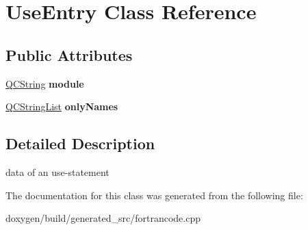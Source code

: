\hypertarget{class_use_entry}{}\section{Use\+Entry Class Reference}
\label{class_use_entry}
\subsection*{Public Attributes}
\begin{DoxyCompactItemize}
\item 
\mbox{\label{class_use_entry_a84f8f457213f3f11338ad766412dbb4b}} 
\mbox{\hyperlink{class_q_c_string}{Q\+C\+String}} {\bfseries module}
\item 
\mbox{\label{class_use_entry_a8be0a17b2d123828d2e86709266e0eea}} 
\mbox{\hyperlink{class_q_c_string_list}{Q\+C\+String\+List}} {\bfseries only\+Names}
\end{DoxyCompactItemize}


\subsection{Detailed Description}
data of an use-\/statement 

The documentation for this class was generated from the following file\+:\begin{DoxyCompactItemize}
\item 
doxygen/build/generated\+\_\+src/fortrancode.\+cpp\end{DoxyCompactItemize}
